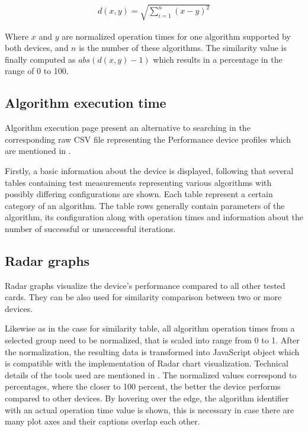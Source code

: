 \begin{align*}
    d(x, y) = \sqrt{\sum_{i=1}^{n}(x - y)^{2}} 
\end{align*}

Where $x$ and $y$ are normalized operation times for one algorithm supported by both devices, and $n$ is the number of these algorithms. The similarity value is finally computed as $abs(d(x, y) - 1)$ which results in a percentage in the range of 0 to 100.


\subsection{Algorithm execution time}
Algorithm execution page present an alternative to searching in the corresponding raw CSV file representing the Performance device profiles which are mentioned in  . 

Firstly, a basic information about the device is displayed, following that several tables containing test measurements representing various algorithms with possibly differing configurations are shown. Each table represent a certain category of an algorithm. The table rows generally contain parameters of the algorithm, its configuration along with operation times and information about the number of successful or unsuccessful iterations.


\subsection{Radar graphs}
Radar graphs visualize the device's performance compared to all other tested cards. They can be also used for similarity comparison between two or more devices.

Likewise as in the case for similarity table, all algorithm operation times from a selected group need to be normalized, that is scaled into range from 0 to 1. After the normalization, the resulting data is transformed into JavaScript object which is compatible with the implementation of Radar chart visualization. Technical details of the tools used are mentioned in . The normalized values correspond to percentages, where the closer to 100 percent, the better the device performs compared to other devices. By hovering over the edge, the algorithm identifier with an actual operation time value is shown, this is necessary in case there are many plot axes and their captions overlap each other.


